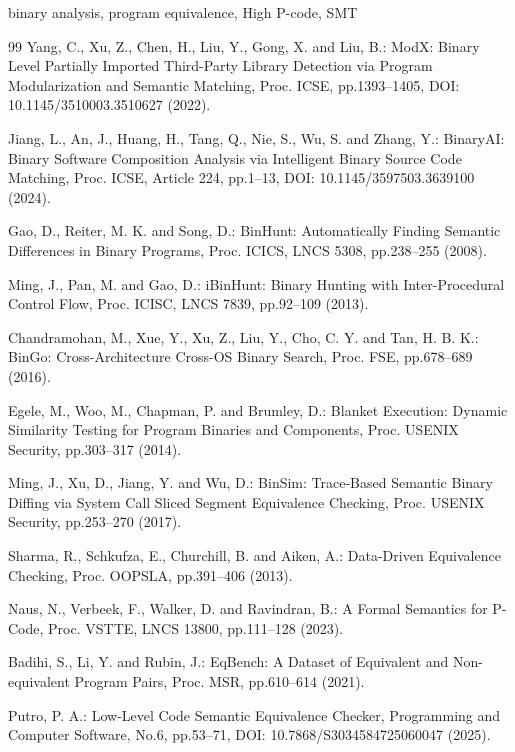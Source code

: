 \documentclass{css}
\begin{document}
\begin{ekeyword}
binary analysis, program equivalence, High P-code, SMT
\end{ekeyword}

\maketitle







\begin{thebibliography}{99}
Yang, C., Xu, Z., Chen, H., Liu, Y., Gong, X. and Liu, B.:
ModX: Binary Level Partially Imported Third-Party Library Detection via Program Modularization and Semantic Matching,
Proc. ICSE, pp.1393--1405, DOI: 10.1145/3510003.3510627 (2022).

Jiang, L., An, J., Huang, H., Tang, Q., Nie, S., Wu, S. and Zhang, Y.:
BinaryAI: Binary Software Composition Analysis via Intelligent Binary Source Code Matching,
Proc. ICSE, Article 224, pp.1--13, DOI: 10.1145/3597503.3639100 (2024).

Gao, D., Reiter, M. K. and Song, D.:
BinHunt: Automatically Finding Semantic Differences in Binary Programs,
Proc. ICICS, LNCS 5308, pp.238--255 (2008).

Ming, J., Pan, M. and Gao, D.:
iBinHunt: Binary Hunting with Inter-Procedural Control Flow,
Proc. ICISC, LNCS 7839, pp.92--109 (2013).

Chandramohan, M., Xue, Y., Xu, Z., Liu, Y., Cho, C. Y. and Tan, H. B. K.:
BinGo: Cross-Architecture Cross-OS Binary Search,
Proc. FSE, pp.678--689 (2016).

Egele, M., Woo, M., Chapman, P. and Brumley, D.:
Blanket Execution: Dynamic Similarity Testing for Program Binaries and Components,
Proc. USENIX Security, pp.303--317 (2014).

Ming, J., Xu, D., Jiang, Y. and Wu, D.:
BinSim: Trace-Based Semantic Binary Diffing via System Call Sliced Segment Equivalence Checking,
Proc. USENIX Security, pp.253--270 (2017).

Sharma, R., Schkufza, E., Churchill, B. and Aiken, A.:
Data-Driven Equivalence Checking,
Proc. OOPSLA, pp.391--406 (2013).

Naus, N., Verbeek, F., Walker, D. and Ravindran, B.:
A Formal Semantics for P-Code,
Proc. VSTTE, LNCS 13800, pp.111--128 (2023).

Badihi, S., Li, Y. and Rubin, J.:
EqBench: A Dataset of Equivalent and Non-equivalent Program Pairs,
Proc. MSR, pp.610--614 (2021).

Putro, P. A.:
Low-Level Code Semantic Equivalence Checker,
Programming and Computer Software, No.6, pp.53--71,
DOI: 10.7868/S3034584725060047 (2025).
\end{thebibliography}
\end{document}
